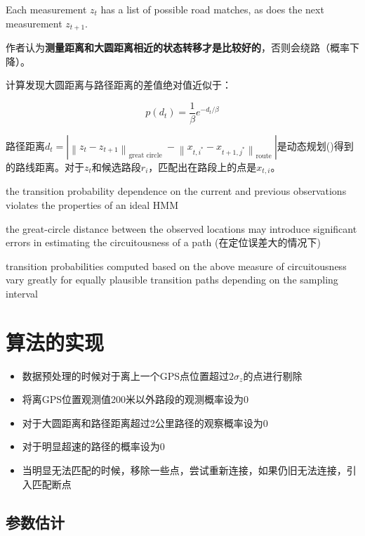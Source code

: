 Each measurement $ z_{t} $ has a list of possible road matches, as does the next measurement $ z_{t+1} $. 

作者认为\textbf{测量距离和大圆距离相近的状态转移才是比较好的}，否则会绕路（概率下降）。

计算发现大圆距离与路径距离的差值绝对值近似于：

$$ p\left(d_{t}\right)=\frac{1}{\beta} e^{-d_{t} / \beta} $$

路径距离$ d_{t}=\left|\left\|z_{t}-z_{t+1}\right\|_{\text {great circle }}-\left\|x_{t, i^{*}}-x_{t+1, j^{*}}\right\|_{\text {route }}\right| $是动态规划()得到的路线距离。对于$z_t$和候选路段$r_i$，匹配出在路段上的点是$ x_{t, i} $。

\begin{remark}
      \label{Comment:HMM-TransitionProbability}

      the transition probability
        dependence on the current and previous observations
    violates the properties of an ideal HMM

    the great-circle distance between
the observed locations may introduce significant errors in
estimating the circuitousness of a path (在定位误差大的情况下)

transition probabilities computed
based on the above measure of circuitousness vary greatly for
equally plausible transition paths depending on the sampling
interval
\end{remark}

\section{算法的实现}

\begin{itemize}
    \item 数据预处理的时候对于离上一个GPS点位置超过$ 2 \sigma_{z} $的点进行剔除
    \item 将离GPS位置观测值200米以外路段的观测概率设为0
    \item 对于大圆距离和路径距离超过2公里路径的观察概率设为0
    \item 对于明显超速的路径的概率设为0
    \item 当明显无法匹配的时候，移除一些点，尝试重新连接，如果仍旧无法连接，引入匹配断点
\end{itemize}

\subsection{参数估计}

